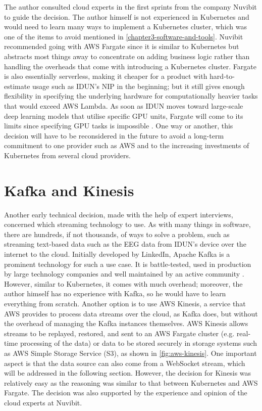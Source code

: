 The author consulted cloud experts in the first sprints from the company Nuvibit to guide the decision. The author himself is not experienced in Kubernetes and would need to learn many ways to implement a Kubernetes cluster, which was one of the items to avoid mentioned in \autoref{chapter3-software-and-tools}. Nuvibit recommended going with AWS Fargate since it is similar to Kubernetes but abstracts most things away to concentrate on adding business logic rather than handling the overheads that come with introducing a Kubernetes cluster. Fargate is also essentially serverless, making it cheaper for a product with hard-to-estimate usage such as IDUN’s NIP in the beginning; but it still gives enough flexibility in specifying the underlying hardware for computationally heavier tasks that would exceed AWS Lambda. As soon as IDUN moves toward large-scale deep learning models that utilise specific GPU units, Fargate will come to its limits since specifying GPU tasks is impossible \citep{amazon_web_services_inc_aws_2019}. One way or another, this decision will have to be reconsidered in the future to avoid a long-term commitment to one provider such as AWS and to the increasing investments of Kubernetes from several cloud providers.

\section*{Kafka and Kinesis}
\label{chapter4-kafka-aws-kinesis}

Another early technical decision, made with the help of expert interviews, concerned which streaming technology to use. As with many things in software, there are hundreds, if not thousands, of ways to solve a problem, such as streaming text-based data such as the EEG data from IDUN’s device over the internet to the cloud. Initially developed by LinkedIn, Apache Kafka is a prominent technology for such a use case. It is battle-tested, used in production by large technology companies \citep{apache_apache_nodate} and well maintained by an active community \citep{noauthor_apache_2022}. However, similar to Kubernetes, it comes with much overhead; moreover, the author himself has no experience with Kafka, so he would have to learn everything from scratch. Another option is to use AWS Kinesis, a service that AWS provides to process data streams over the cloud, as Kafka does, but without the overhead of managing the Kafka instances themselves. AWS Kinesis allows streams to be replayed, restored, and sent to an AWS Fargate cluster (e.g. real-time processing of the data) or data to be stored securely in storage systems such as AWS Simple Storage Service (S3), as shown in \autoref{fig:aws-kinesis}. One important aspect is that the data source can also come from a WebSocket stream, which will be addressed in the following section. However, the decision for Kinesis was relatively easy as the reasoning was similar to that between Kubernetes and AWS Fargate. The decision was also supported by the experience and opinion of the cloud experts at Nuvibit.


